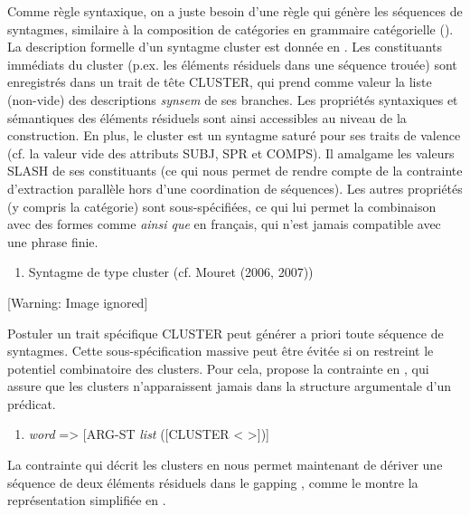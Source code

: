 Comme règle syntaxique, on a juste besoin d'une règle qui génère les séquences de syntagmes, similaire à la composition de catégories en grammaire catégorielle (\citet{Steedman1990}). La description formelle d'un syntagme cluster est donnée en . Les constituants immédiats du cluster (p.ex. les éléments résiduels dans une séquence trouée) sont enregistrés dans un trait de tête CLUSTER, qui prend comme valeur la liste (non-vide) des descriptions \textit{synsem} de ses branches. Les propriétés syntaxiques et sémantiques des éléments résiduels sont ainsi accessibles au niveau de la construction. En plus, le cluster est un syntagme saturé pour ses traits de valence (cf. la valeur vide des attributs SUBJ, SPR et COMPS). Il amalgame les valeurs SLASH de ses constituants (ce qui nous permet de rendre compte de la contrainte d'extraction parallèle hors d'une coordination de séquences). Les autres propriétés (y compris la catégorie) sont sous-spécifiées, ce qui lui permet la combinaison avec des formes comme \textit{ainsi que} en français, qui n'est jamais compatible avec une phrase finie. 


\begin{enumerate}
\item \label{bkm:Ref299878790}Syntagme de type cluster (cf. Mouret (2006, 2007))


\end{enumerate}
  [Warning: Image ignored] %
 

Postuler un trait spécifique CLUSTER peut générer a priori toute séquence de syntagmes. Cette sous-spécification massive peut être évitée si on restreint le potentiel combinatoire des clusters. Pour cela, \citet{Mouret2007} propose la contrainte en , qui assure que les clusters n'apparaissent jamais dans la structure argumentale d'un prédicat.  


\begin{enumerate}
\item \label{bkm:Ref299888553}\textit{word} ={\textgreater} [ARG-ST \textit{list} ([CLUSTER {\textless} {\textgreater}])]


\end{enumerate}
La contrainte qui décrit les clusters en  nous permet maintenant de dériver une séquence de deux éléments résiduels dans le gapping , comme le montre la représentation simplifiée en .


